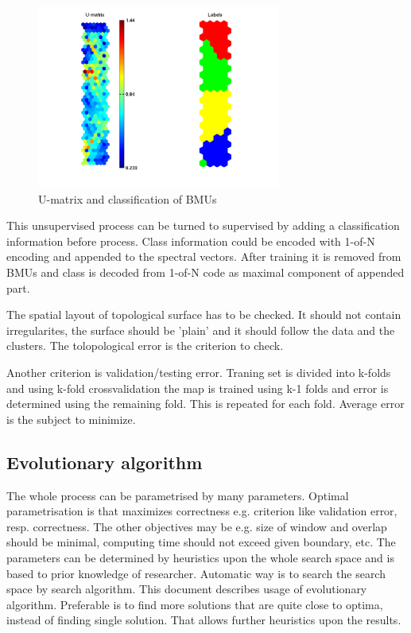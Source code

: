 \documentclass[a4paper,journal]{IEEEtran}
\begin{document}
\begin{figure}[h]
\centering
\includegraphics[width=80mm]{som_umat}
\caption{U-matrix and classification of BMUs}
\label{som_umat}
\end{figure}

This unsupervised process can be turned to supervised by adding a classification
information before process.
Class information  could be encoded with 1-of-N encoding and appended to the 
spectral vectors. After training it is removed from BMUs and class is 
decoded from 1-of-N code as maximal component of appended part.

The spatial 
layout of topological surface has to be checked. It should not contain irregularites, 
the surface should be 'plain' and it should follow the data and the clusters. 
The tolopological error is the criterion to check.

Another criterion is validation/testing error. Traning set is divided into k-folds
and using k-fold crossvalidation the map is trained using k-1 folds and  error 
is determined using the remaining fold. This is repeated for each fold. Average error is 
the subject to minimize.


\subsection{Evolutionary algorithm}
The whole process can be parametrised by many parameters. Optimal parametrisation 
is that maximizes correctness e.g. criterion like validation error, resp. correctness.
The other objectives may be e.g. size of window and overlap
should be minimal, computing time should not exceed given boundary, etc.
The parameters can be determined by heuristics upon the whole search space and
is based to prior knowledge of researcher.
Automatic way is to search the search space by search algorithm. This document
describes usage of evolutionary algorithm.
Preferable is to find more solutions that are quite close to optima, instead of 
finding single solution. That allows further heuristics upon the results.
\end{document}

